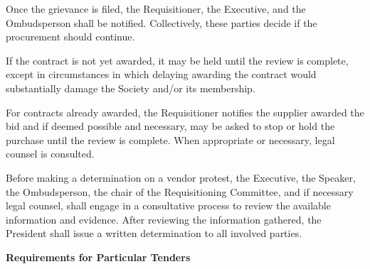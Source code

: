 \begin{longenum}[label*=\thesection.\arabic*., align=left]
\begin{longenum} [label*=\arabic*., align=left]
\item Once the grievance is filed, the Requisitioner, the Executive, and the Ombudsperson shall be notified. Collectively, these parties decide if the procurement should continue.

\item If the contract is not yet awarded, it may be held until the review is complete, except in circumstances in which delaying awarding the contract would substantially damage the Society and/or its membership.

\item For contracts already awarded, the Requisitioner notifies the supplier awarded the bid and if deemed possible and necessary, may be asked to stop or hold the purchase until the review is complete. When appropriate or necessary, legal counsel is consulted.

\item Before making a determination on a vendor protest, the Executive, the Speaker, the Ombudsperson, the chair of the Requisitioning Committee, and if necessary legal counsel, shall engage in a consultative process to review the available information and evidence. After reviewing the information gathered, the President shall issue a written determination to all involved parties.
\end{longenum}

\item \textbf{Requirements for Particular Tenders}


\end{longenum}
